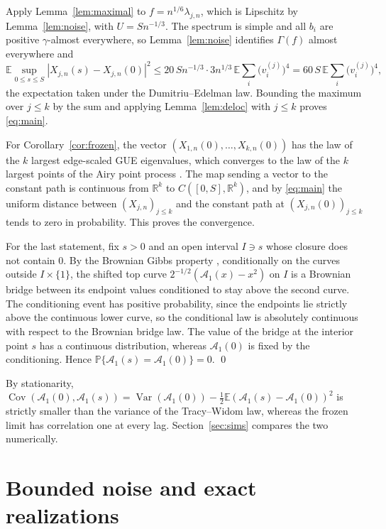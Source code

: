 \documentclass[11pt]{amsart}
\theoremstyle{remark}
\newcommand{\PP}{\mathbb{P}}
\newcommand{\EE}{\mathbb{E}}
\newcommand{\RR}{\mathbb{R}}
\begin{document}
Apply Lemma~\ref{lem:maximal} to $f=n^{1/6}\lambda_{j,n}$, which is Lipschitz by Lemma~\ref{lem:noise}, with
$U=Sn^{-1/3}$. The spectrum is simple and all $b_i$ are positive $\gamma$-almost everywhere, so Lemma~\ref{lem:noise}
identifies $\Gamma(f)$ almost everywhere and
\[
\EE\sup_{0\le s\le S}|X_{j,n}(s)-X_{j,n}(0)|^2\le20\,Sn^{-1/3}\cdot3n^{1/3}\,\EE\sum_i\bigl(v_i^{(j)}\bigr)^4
=60\,S\,\EE\sum_i\bigl(v_i^{(j)}\bigr)^4,
\]
the expectation taken under the Dumitriu--Edelman law. Bounding the maximum over $j\le k$ by the sum and applying
Lemma~\ref{lem:deloc} with $j\le k$ proves \eqref{eq:main}.

For Corollary~\ref{cor:frozen}, the vector $(X_{1,n}(0),\dots,X_{k,n}(0))$ has the law of the $k$ largest edge-scaled GUE
eigenvalues, which converges to the law of the $k$ largest points of the Airy point process \cite{TW94}. The map sending a
vector to the constant path is continuous from $\RR^k$ to $C([0,S],\RR^k)$, and by \eqref{eq:main} the uniform distance
between $(X_{j,n})_{j\le k}$ and the constant path at $(X_{j,n}(0))_{j\le k}$ tends to zero in probability. This proves
the convergence.

For the last statement, fix $s>0$ and an open interval $I\ni s$ whose closure does not contain $0$. By the Brownian Gibbs
property \cite[Theorem~3.1]{CH14}, conditionally on the curves outside $I\times\{1\}$, the shifted top curve
$2^{-1/2}(\mathcal A_1(x)-x^2)$ on $I$ is a Brownian bridge between its endpoint values conditioned to stay above the
second curve. The conditioning event has positive probability, since the endpoints lie strictly above the continuous
lower curve, so the conditional law is absolutely continuous with respect to the Brownian bridge law. The value of the
bridge at the interior point $s$ has a continuous distribution, whereas $\mathcal A_1(0)$ is fixed by the conditioning.
Hence $\PP\{\mathcal A_1(s)=\mathcal A_1(0)\}=0$. \qed

By stationarity, $\operatorname{Cov}(\mathcal A_1(0),\mathcal A_1(s))=\operatorname{Var}(\mathcal A_1(0))-\frac12
\EE(\mathcal A_1(s)-\mathcal A_1(0))^2$ is strictly smaller than the variance of the Tracy--Widom law, whereas the frozen
limit has correlation one at every lag. Section~\ref{sec:sims} compares the two numerically.

\section{Bounded noise and exact realizations}\label{sec:extensions}
\end{document}
